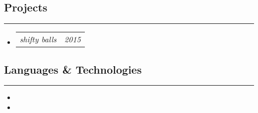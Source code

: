 \documentclass[11pt,letterpaper]{article}
\makeatletter
\newcommand{\headerrow}[2]
{\begin{tabular*}{\linewidth}{l@{\extracolsep{\fill}}r}
    #1 &
    #2 \\
\end{tabular*}}
\makeatother
\begin{document}
\vspace{-1.5em}
\subsection*{Projects}
\vspace{-0.4em}
\hrule

\begin{itemize}[label={},leftmargin=*]
\parskip=0.1em



\item
\headerrow
{\emph{ shifty balls}}
{\emph{ 2015}}



\end{itemize}


\vspace{-.6em}
\subsection*{Languages \& Technologies}
\vspace{-0.4em}
\hrule

\begin{itemize}[leftmargin=*]
\parskip=0.1em


\item 
\item 
\end{itemize}
\end{document}
